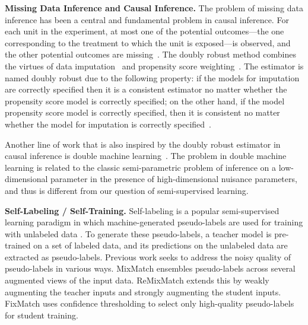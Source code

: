 \noindent \textbf{Missing Data Inference and Causal Inference.} 
The problem of missing data inference has been a central and fundamental problem  in causal inference. For each unit in the experiment, at most one of the potential outcomes—the one corresponding to the treatment to
which the unit is exposed—is observed, and the other
potential outcomes are missing~\citep{holland1986statistics, ding2018causal}. The doubly robust method combines
the virtues of data imputation~\cite{rubin1979using} and propensity
score weighting~\cite{rosenbaum1983central}. The estimator is named doubly robust due to the following property: if the models for imputation are correctly specified then it is a consistent estimator no matter whether the propensity score model is correctly specified; on the other hand, if the model propensity score model is correctly specified, then it is consistent no matter whether the model for imputation is correctly specified~\citep{scharfstein1999adjusting,  bang2005doubly, birhanu2011doubly, ding2018causal}. 

Another line of work that is also inspired by the doubly robust estimator in causal inference is double machine learning~\citep{chernozhukov2018double}. The  problem in double machine learning is related to the classic semi-parametric problem of inference on a low-dimensional parameter in the presence of high-dimensional nuisance parameters, and thus is different from our question of semi-supervised learning. 


\noindent \textbf{Self-Labeling / Self-Training.}
Self-labeling is a popular semi-supervised learning paradigm in which machine-generated pseudo-labels are used for training with unlabeled data \citep{pseudolabel2013,berthelot2019mixmatch,berthelot2019remixmatch,sohn2020fixmatch}. To generate these pseudo-labels, a teacher model is pre-trained on a set of labeled data, and its predictions on the unlabeled data are extracted as pseudo-labels. Previous work seeks to address the noisy quality of pseudo-labels in various ways. MixMatch \cite{berthelot2019mixmatch} ensembles pseudo-labels across several augmented views of the input data. ReMixMatch \cite{berthelot2019remixmatch} extends this by weakly augmenting the teacher inputs and strongly augmenting the student inputs. FixMatch \cite{sohn2020fixmatch} uses confidence thresholding to select only high-quality pseudo-labels for student training.


